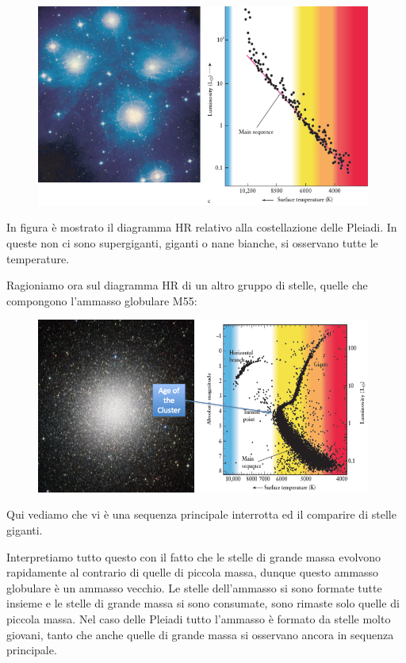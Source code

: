 \begin{figure}[H]
    \centering
    \includegraphics[width=11cm]{Osservazione e diagramma HR della costellazione delle Pleiadi.png}
    \label{fig:Osservazione e diagramma HR della costellazione delle Pleiadi}
\end{figure}

In figura è mostrato il diagramma HR relativo alla costellazione delle Pleiadi. In queste non ci sono supergiganti, giganti o nane bianche, si osservano tutte le temperature.

Ragioniamo ora sul diagramma HR di un altro gruppo di stelle, quelle che compongono l'ammasso globulare M55: 

\begin{figure}[H]
    \centering
    \includegraphics[width=11cm]{Ammasso globulare.png}
    \label{fig:Ammasso globulare}
\end{figure}

Qui vediamo che vi è una sequenza principale interrotta ed il comparire di stelle giganti.

Interpretiamo tutto questo con il fatto che le stelle di grande massa evolvono rapidamente al contrario di quelle di piccola massa, dunque questo ammasso globulare è un ammasso vecchio. Le stelle dell'ammasso si sono formate tutte insieme e le stelle di grande massa si sono consumate, sono rimaste solo quelle di piccola massa. Nel caso delle Pleiadi tutto l'ammasso è formato da stelle molto giovani, tanto che anche quelle di grande massa si osservano ancora in sequenza principale. 

